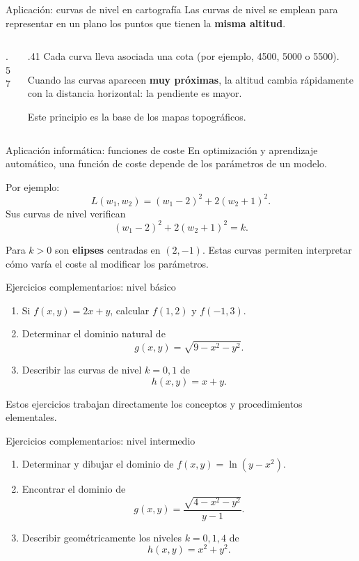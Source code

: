 \documentclass[main.tex]{subfiles}
\begin{document}
\begin{frame}{Aplicación: curvas de nivel en cartografía}
Las curvas de nivel se emplean para representar en un plano los puntos que tienen la \textbf{misma altitud}.
\begin{columns}[c]
\begin{column}{.57\textwidth}
\end{column}
\begin{column}{.41\textwidth}
\small
Cada curva lleva asociada una cota (por ejemplo, 4500, 5000 o 5500).
\medskip

Cuando las curvas aparecen \textbf{muy próximas}, la altitud cambia rápidamente con la distancia horizontal: la pendiente es mayor.
\medskip

Este principio es la base de los mapas topográficos.
\end{column}
\end{columns}
\end{frame}
\begin{frame}{Aplicación informática: funciones de coste}
En optimización y aprendizaje automático, una función de coste depende de los parámetros de un modelo.
\medskip

Por ejemplo:
\[
L(w_1,w_2)=(w_1-2)^2+2(w_2+1)^2.
\]
Sus curvas de nivel verifican
\[
(w_1-2)^2+2(w_2+1)^2=k.
\]
\medskip

Para $k>0$ son \textbf{elipses} centradas en $(2,-1)$.
Estas curvas permiten interpretar cómo varía el coste al modificar los parámetros.
\end{frame}

\begin{frame}{Ejercicios complementarios: nivel básico}
\begin{enumerate}
\item Si $f(x,y)=2x+y$, calcular $f(1,2)$ y $f(-1,3)$.
\medskip
\item Determinar el dominio natural de
\[
g(x,y)=\sqrt{9-x^2-y^2}.
\]
\item Describir las curvas de nivel $k=0,1$ de
\[
h(x,y)=x+y.
\]
\end{enumerate}
\medskip
\small Estos ejercicios trabajan directamente los conceptos y procedimientos elementales.
\end{frame}

\begin{frame}{Ejercicios complementarios: nivel intermedio}
\begin{enumerate}
\item Determinar y dibujar el dominio de $f(x,y)=\ln(y-x^2)$.
\medskip
\item Encontrar el dominio de
\[
g(x,y)=\frac{\sqrt{4-x^2-y^2}}{y-1}.
\]
\item Describir geométricamente los niveles $k=0,1,4$ de
\[
h(x,y)=x^2+y^2.
\]
\end{enumerate}
\end{frame}
\end{document}
